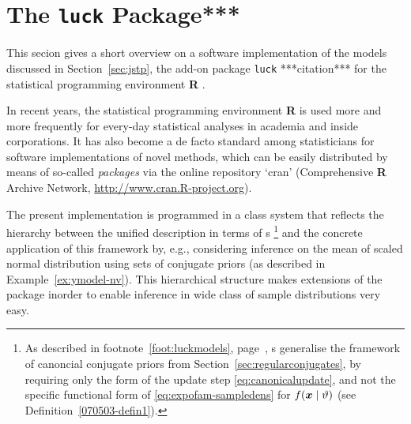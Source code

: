 \section{The \texttt{luck} Package***} %
\label{sec:luck}



This secion gives a short overview on a software implementation of the models discussed in Section~\ref{sec:jstp},
the add-on package \texttt{luck} ***citation*** for the statistical programming environment \textbf{R} \parencite{2013:r}.

\medskip

In recent years, the statistical programming environment %
\textbf{R} is used more and more frequently for every-day statistical analyses
in academia and inside corporations. %
It has also become a de facto standard among
statisticians for software implementations of novel methods,
which can be easily distributed by means of so-called \emph{packages}
via the online repository `cran' (Comprehensive \textbf{R} Archive Network, \url{http://www.cran.R-project.org}).

The present implementation is programmed in a class system
that reflects %
the hierarchy between the unified description in terms of \model s%
\footnote{As described in footnote~\ref{foot:luckmodels}, page~\pageref{foot:luckmodels},
\model s generalise the framework
of canoncial conjugate priors from Section~\ref{sec:regularconjugates},
by requiring only the form of the update step \eqref{eq:canonicalupdate},
and not the specific functional form of \eqref{eq:expofam-sampledens} for $f({\bm x} \mid \vartheta)$
(see Definition~\ref{070503-defin1}).}
and the concrete application of this framework by, e.g.,
considering inference on the mean of scaled normal distribution using sets of conjugate priors
(as described in Example~\ref{ex:ymodel-nv}).
This hierarchical structure makes extensions of the package inorder to
enable inference in wide class of sample distributions very easy.

